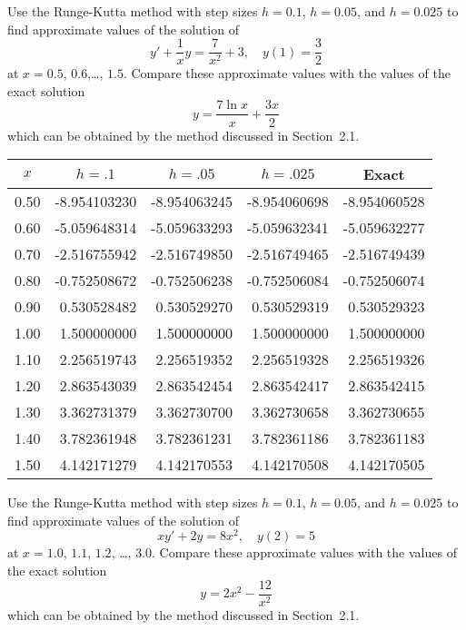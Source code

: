 \documentclass{ximera}
\begin{document}
\begin{problem}\label{exer:3.3.26}
Use the Runge-Kutta  method with step sizes $h=0.1$,  $h=0.05$,
and $h=0.025$
 to find approximate values of the solution of
$$
y'+\frac{1}{x}y=\frac{7}{x^2}+3,\quad y(1)=\frac{3}{2}
$$
at $x=0.5$, $0.6$,\dots, $1.5$.
 Compare these approximate values
with the values of the exact solution
$$
y=\frac{7\ln x}{x}+\frac{3x}{2}
$$
which can be obtained by the method discussed in
Section~2.1.

\begin{solution}
    {\small
\begin{tabular}{|r|r|r|r|r|}
\hline
\multicolumn{1}{|c|}{$x$}&
\multicolumn{1}{|c|}{$h=.1$}&
\multicolumn{1}{|c|}{$h=.05$}&
\multicolumn{1}{|c|}{$h=.025$}&
\multicolumn{1}{|c|}{Exact}\\ \hline
 0.50  &  -8.954103230 & -8.954063245 &  -8.954060698 & -8.954060528 \\
 0.60  &  -5.059648314 & -5.059633293 &  -5.059632341 & -5.059632277 \\
 0.70  &  -2.516755942 & -2.516749850 &  -2.516749465 & -2.516749439 \\
 0.80  &  -0.752508672 & -0.752506238 &  -0.752506084 & -0.752506074 \\
 0.90  &   0.530528482 &  0.530529270 &   0.530529319 &  0.530529323 \\
 1.00  &   1.500000000 &  1.500000000 &   1.500000000 &  1.500000000 \\
 1.10  &   2.256519743 &  2.256519352 &   2.256519328 &  2.256519326 \\
 1.20  &   2.863543039 &  2.863542454 &   2.863542417 &  2.863542415 \\
 1.30  &   3.362731379 &  3.362730700 &   3.362730658 &  3.362730655 \\
 1.40  &   3.782361948 &  3.782361231 &   3.782361186 &  3.782361183 \\
 1.50  &   4.142171279 &  4.142170553 &   4.142170508 &  4.142170505 \\
\hline
\end{tabular}}

\end{solution}
\end{problem}

\begin{problem}\label{exer:3.3.27}
Use the Runge-Kutta  method with step sizes $h=0.1$,  $h=0.05$,
and $h=0.025$
 to find approximate values of the solution of
$$
xy'+2y=8x^2,\quad y(2)=5
$$
at $x=1.0$, $1.1$, $1.2$, \dots, $3.0$.
 Compare these approximate values
with the values of the exact solution
$$
y=2x^2-\frac{12}{x^2}
$$
which can be obtained by the method discussed in Section~2.1.
\end{problem}
\end{document}
